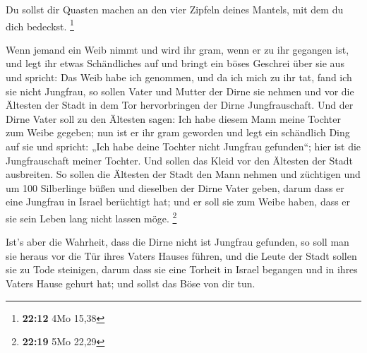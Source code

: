  Du sollst dir Quasten machen an den vier Zipfeln deines
Mantels, mit dem du dich bedeckst. \footnote{\textbf{22:12} 4Mo 15,38}

 Wenn jemand ein Weib nimmt und wird ihr gram, wenn er zu
ihr gegangen ist,  und legt ihr etwas Schändliches auf
und bringt ein böses Geschrei über sie aus und spricht: Das Weib habe
ich genommen, und da ich mich zu ihr tat, fand ich sie nicht Jungfrau,
 so sollen Vater und Mutter der Dirne sie nehmen und vor
die Ältesten der Stadt in dem Tor hervorbringen der Dirne
Jungfrauschaft.  Und der Dirne Vater soll zu den Ältesten
sagen: Ich habe diesem Mann meine Tochter zum Weibe gegeben; nun ist er
ihr gram geworden  und legt ein schändlich Ding auf sie
und spricht: „Ich habe deine Tochter nicht Jungfrau gefunden``; hier ist
die Jungfrauschaft meiner Tochter. Und sollen das Kleid vor den Ältesten
der Stadt ausbreiten.  So sollen die Ältesten der Stadt
den Mann nehmen und züchtigen  und um 100 Silberlinge
büßen und dieselben der Dirne Vater geben, darum dass er eine Jungfrau
in Israel berüchtigt hat; und er soll sie zum Weibe haben, dass er sie
sein Leben lang nicht lassen möge. \footnote{\textbf{22:19} 5Mo 22,29}

 Ist's aber die Wahrheit, dass die Dirne nicht ist
Jungfrau gefunden,  so soll man sie heraus vor die Tür
ihres Vaters Hauses führen, und die Leute der Stadt sollen sie zu Tode
steinigen, darum dass sie eine Torheit in Israel begangen und in ihres
Vaters Hause gehurt hat; und sollst das Böse von dir tun.


